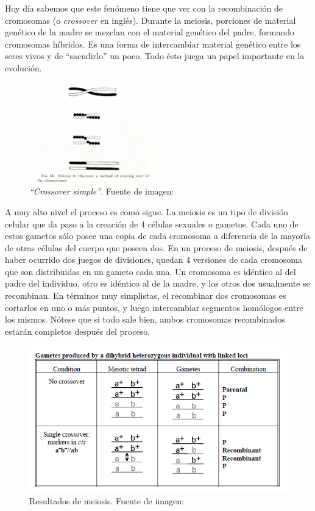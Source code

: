 \documentclass{article}
\begin{document}
	
	Hoy día sabemos que este fenómeno tiene que ver con la recombinación de cromosomas (o \emph{crossover} en inglés). Durante la meiosis, porciones de material genético de la madre se mezclan con el material genético del padre, formando cromosomas híbridos. Es una forma de intercambiar material genético entre los seres vivos y de ``sacudirlo'' un poco. Todo ésto juega un papel importante en la evolución.
	
	\begin{figure}[h]
		\centering
		\includegraphics[width=0.5\textwidth]{images/2.jpg}
		\caption{\emph{``Crossover simple''}. Fuente de imagen: \cite{morgan1916critique}}
		\label{2}
	\end{figure}
	
	A muy alto nivel el proceso es como sigue. La meiosis es un tipo de división celular que da paso a la creación de 4 células sexuales o gametos. Cada uno de estos gametos sólo posee una copia de cada cromosoma a diferencia de la mayoría de otras células del cuerpo que poseen dos. En un proceso de meiosis, después de haber ocurrido dos juegos de divisiones, quedan 4 versiones de cada cromosoma que son distribuidas en un gameto cada una. Un cromosoma es idéntico al del padre del individuo, otro es idéntico al de la madre, y los otros dos usualmente se recombinan. En términos muy simplistas, el recombinar dos cromosomas es cortarlos en uno o más puntos, y luego intercambiar segmentos homólogos entre los mismos. Nótese que si todo sale bien, ambos cromosomas recombinados estarán completos después del proceso.
	
	\begin{figure}[h]
		\centering
		\includegraphics[scale=0.7]{images/3.png}
		\caption{Resultados de meiosis. Fuente de imagen: \cite{carrinnes2003handbook}}
		\label{3}
	\end{figure}
	
\end{document}
